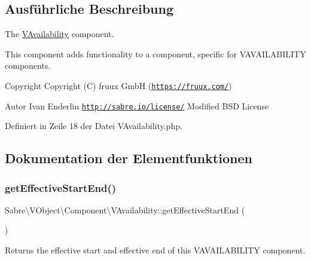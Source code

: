 \subsection{Ausführliche Beschreibung}
The \mbox{\hyperlink{class_sabre_1_1_v_object_1_1_component_1_1_v_availability}{V\+Availability}} component.

This component adds functionality to a component, specific for V\+A\+V\+A\+I\+L\+A\+B\+I\+L\+I\+TY components.

\begin{DoxyCopyright}{Copyright}
Copyright (C) fruux GmbH (\href{https://fruux.com/}{\tt https\+://fruux.\+com/}) 
\end{DoxyCopyright}
\begin{DoxyAuthor}{Autor}
Ivan Enderlin  \href{http://sabre.io/license/}{\tt http\+://sabre.\+io/license/} Modified B\+SD License 
\end{DoxyAuthor}


Definiert in Zeile 18 der Datei V\+Availability.\+php.



\subsection{Dokumentation der Elementfunktionen}
\mbox{\label{class_sabre_1_1_v_object_1_1_component_1_1_v_availability_a384bdfff5e98c7a686f55a6202fa898e}} 
\subsubsection{\texorpdfstring{get\+Effective\+Start\+End()}{getEffectiveStartEnd()}}
{\footnotesize\ttfamily Sabre\textbackslash{}\+V\+Object\textbackslash{}\+Component\textbackslash{}\+V\+Availability\+::get\+Effective\+Start\+End (\begin{DoxyParamCaption}{ }\end{DoxyParamCaption})}

Returns the \textquotesingle{}effective start\textquotesingle{} and \textquotesingle{}effective end\textquotesingle{} of this V\+A\+V\+A\+I\+L\+A\+B\+I\+L\+I\+TY component.

